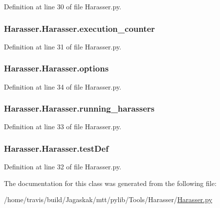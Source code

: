 Definition at line 30 of file Harasser.\-py.

\hypertarget{classHarasser_1_1Harasser_a96c7c91ef5d33784056c567ba49a2c8a}{
\subsubsection[{execution\-\_\-counter}]{\setlength{\rightskip}{0pt plus 5cm}Harasser.\-Harasser.\-execution\-\_\-counter}}\label{classHarasser_1_1Harasser_a96c7c91ef5d33784056c567ba49a2c8a}


Definition at line 31 of file Harasser.\-py.

\hypertarget{classHarasser_1_1Harasser_ab9ed73d71cdaae7d9b5cc81548823527}{
\subsubsection[{options}]{\setlength{\rightskip}{0pt plus 5cm}Harasser.\-Harasser.\-options}}\label{classHarasser_1_1Harasser_ab9ed73d71cdaae7d9b5cc81548823527}


Definition at line 34 of file Harasser.\-py.

\hypertarget{classHarasser_1_1Harasser_ad9d37d39c99222e899af613a573ecd15}{
\subsubsection[{running\-\_\-harassers}]{\setlength{\rightskip}{0pt plus 5cm}Harasser.\-Harasser.\-running\-\_\-harassers}}\label{classHarasser_1_1Harasser_ad9d37d39c99222e899af613a573ecd15}


Definition at line 33 of file Harasser.\-py.

\hypertarget{classHarasser_1_1Harasser_adddf34aabbc91934437e1a30134224c3}{
\subsubsection[{test\-Def}]{\setlength{\rightskip}{0pt plus 5cm}Harasser.\-Harasser.\-test\-Def}}\label{classHarasser_1_1Harasser_adddf34aabbc91934437e1a30134224c3}


Definition at line 32 of file Harasser.\-py.



The documentation for this class was generated from the following file\-:\begin{DoxyCompactItemize}
\item 
/home/travis/build/\-Jagaskak/mtt/pylib/\-Tools/\-Harasser/\hyperlink{Harasser_8py}{Harasser.\-py}\end{DoxyCompactItemize}
